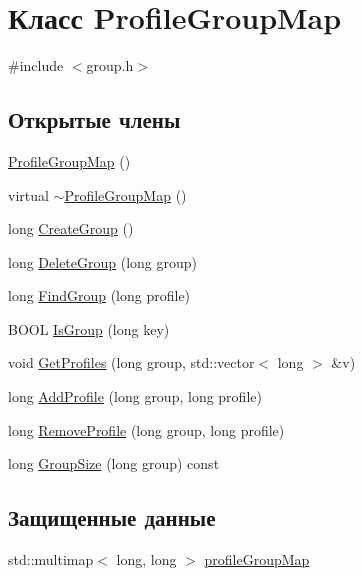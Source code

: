 \hypertarget{class_profile_group_map}{\section{Класс Profile\-Group\-Map}
\label{class_profile_group_map}
}


{\ttfamily \#include $<$group.\-h$>$}

\subsection*{Открытые члены}
\begin{DoxyCompactItemize}
\item 
\hyperlink{class_profile_group_map_a4da360b92d506d2c5eb8e0714d1f8568}{Profile\-Group\-Map} ()
\item 
virtual \hyperlink{class_profile_group_map_ad27bee5e167fb91d78c7f20ada546223}{$\sim$\-Profile\-Group\-Map} ()
\item 
long \hyperlink{class_profile_group_map_a308962453d061080709b15c123ea315b}{Create\-Group} ()
\item 
long \hyperlink{class_profile_group_map_a1e98a9cbf25c483b34643a09b1b5d223}{Delete\-Group} (long group)
\item 
long \hyperlink{class_profile_group_map_a52340323d2019383463a5e680824e5b4}{Find\-Group} (long profile)
\item 
B\-O\-O\-L \hyperlink{class_profile_group_map_a5080006c6f934ca4fe60760b9d9f977c}{Is\-Group} (long key)
\item 
void \hyperlink{class_profile_group_map_a8fcea76f2d98f0202c372b16fe50516f}{Get\-Profiles} (long group, std\-::vector$<$ long $>$ \&v)
\item 
long \hyperlink{class_profile_group_map_afe8dd6d5fa977157ab1409e34c6e74b7}{Add\-Profile} (long group, long profile)
\item 
long \hyperlink{class_profile_group_map_acc829c55777b1259dd85a29eff8dfc74}{Remove\-Profile} (long group, long profile)
\item 
long \hyperlink{class_profile_group_map_ab21bc6513d62c524d706b1abfa3898c5}{Group\-Size} (long group) const 
\end{DoxyCompactItemize}
\subsection*{Защищенные данные}
\begin{DoxyCompactItemize}
\item 
std\-::multimap$<$ long, long $>$ \hyperlink{class_profile_group_map_aaa634cacaf0255308986bf2aa7ecd7f1}{profile\-Group\-Map}
\end{DoxyCompactItemize}

